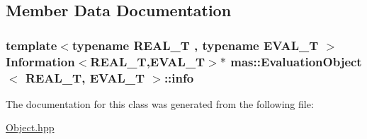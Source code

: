 \subsection{Member Data Documentation}
\hypertarget{classmas_1_1_evaluation_object_a5029ee28e34a1496c3c46dc82c5d8b8d}{}
\subsubsection[{info}]{\setlength{\rightskip}{0pt plus 5cm}template$<$typename R\+E\+A\+L\+\_\+\+T , typename E\+V\+A\+L\+\_\+\+T $>$ {\bf Information}$<$R\+E\+A\+L\+\_\+\+T,E\+V\+A\+L\+\_\+\+T$>$$\ast$ {\bf mas\+::\+Evaluation\+Object}$<$ R\+E\+A\+L\+\_\+\+T, E\+V\+A\+L\+\_\+\+T $>$\+::info\hspace{0.3cm}{\ttfamily [protected]}}\label{classmas_1_1_evaluation_object_a5029ee28e34a1496c3c46dc82c5d8b8d}


The documentation for this class was generated from the following file\+:\begin{DoxyCompactItemize}
\item 
\hyperlink{_object_8hpp}{Object.\+hpp}\end{DoxyCompactItemize}

